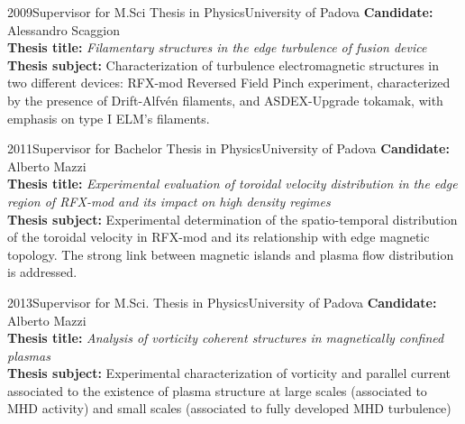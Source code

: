 {\begin{entrylist}
\entry
{2009}{Supervisor for M.Sci Thesis in Physics}{University of
  Padova}
{ \textbf{Candidate:} Alessandro Scaggion \\
\textbf{Thesis title:} \emph{Filamentary structures in the edge
  turbulence of fusion device} \\
\textbf{Thesis subject:} Characterization of turbulence
electromagnetic structures in two different devices: RFX-mod Reversed
Field Pinch experiment, characterized by the presence of
Drift-Alfv\'en filaments, and ASDEX-Upgrade tokamak, with emphasis on
type I ELM's filaments.
}

\entry
{2011}{Supervisor for Bachelor Thesis in Physics}{University of
  Padova}
{ \textbf{Candidate:} Alberto Mazzi \\
\textbf{Thesis title:} \emph{Experimental evaluation of toroidal
   velocity distribution in the edge region of RFX-mod and its impact
   on high density regimes} \\
\textbf{Thesis subject:} Experimental determination of the
 spatio-temporal distribution of the toroidal
 velocity  in RFX-mod and its relationship with edge magnetic
 topology. The strong link between magnetic islands and
 plasma flow distribution is addressed.
}

\entry
{2013}{Supervisor for M.Sci. Thesis in Physics}{University of
  Padova}
{ \textbf{Candidate:} Alberto Mazzi \\
\textbf{Thesis title:} \emph{Analysis of vorticity coherent structures
in magnetically confined plasmas} \\
\textbf{Thesis subject:} Experimental characterization of vorticity
and parallel current associated to the existence of plasma structure
at large scales (associated to MHD activity) and small scales
(associated to fully developed MHD turbulence)
}


\end{entrylist}
}
